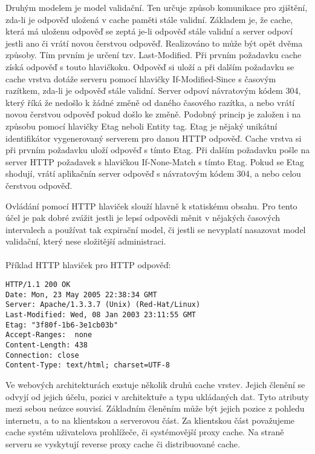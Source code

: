 \documentclass[12pt]{article}
\begin{document}
Druhým modelem je model validační. Ten určuje způsob komunikace pro zjištění, zda-li je odpověď uložená v cache paměti stále validní. Základem je, že cache, která má uloženu odpověď se zeptá je-li odpověď stále validní a server odpoví jestli ano či vrátí novou čerstvou odpověď. Realizováno to může být opět dvěma způsoby. Tím prvním je určení tzv. Last-Modified. Při prvním požadavku cache získá odpověď s touto hlavičkoku. Odpověď si uloží a při dalším požadavku se cache vrstva dotáže serveru pomocí hlavičky If-Modified-Since s časovým razítkem, zda-li je odpověď stále validní. Server odpoví návratovým kódem 304, který říká že nedošlo k žádné změně od daného časového razítka, a nebo vrátí novou čerstvou odpověď pokud došlo ke změně. Podobný princip je založen i na způsobu pomocí hlavičky Etag neboli Entity tag. Etag je nějaký unikátní identifikátor vygenerovaný serverem pro danou HTTP odpověď. Cache vrstva si při prvním požadavku uloží odpověď s tímto Etag. Při dalším požadavku pošle na server HTTP požadavek s hlavičkou If-None-Match s tímto Etag. Pokud se Etag shodují, vrátí aplikačnín server odpověď s návratovým kódem 304, a nebo celou čerstvou odpověď.\cite{rfc-http}

Ovládání pomocí HTTP hlaviček slouží hlavně k statiskému obsahu. Pro tento účel je pak dobré zvážit jestli je lepsí odpovědi měnit v nějakých časových intervalech a používat tak expirační model, či jestli se nevyplatí nasazovat model validační, který nese složitější administraci.\\
\\
Příklad HTTP hlaviček pro HTTP odpověď:
\begin{scriptsize}
\begin{verbatim}
HTTP/1.1 200 OK
Date: Mon, 23 May 2005 22:38:34 GMT
Server: Apache/1.3.3.7 (Unix) (Red-Hat/Linux)
Last-Modified: Wed, 08 Jan 2003 23:11:55 GMT
Etag: "3f80f-1b6-3e1cb03b"
Accept-Ranges:  none
Content-Length: 438
Connection: close
Content-Type: text/html; charset=UTF-8
\end{verbatim}
\end{scriptsize}

Ve webových architekturách exstuje několik druhů cache vrstev. Jejich členění se odvyjí od jejich účelu, pozici v architektuře a typu ukládaných dat. Tyto atributy mezi sebou neúzce souvisí. Základním členěním může být jejich pozice z pohledu internetu, a to na klientskou a serverovou část. Za klientskou část považujeme cache systém uživatelova prohlížeče, či systémovější proxy cache. Na straně serveru se vyskytují reverse proxy cache či distribuované cache.
\end{document}
